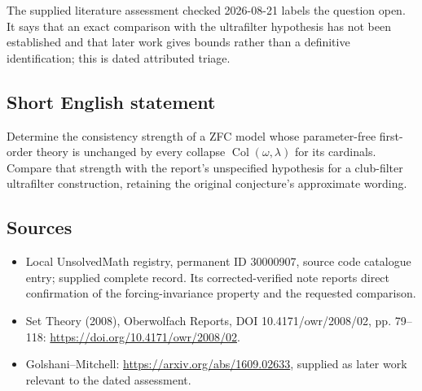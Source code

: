 \documentclass[11pt]{article}
\begin{document}
The supplied literature assessment checked 2026-08-21 labels the question open. It says that an exact comparison with the ultrafilter hypothesis has not been established and that later work gives bounds rather than a definitive identification; this is dated attributed triage.
\subsection{Short English statement}
Determine the consistency strength of a ZFC model whose parameter-free first-order theory is unchanged by every collapse $\operatorname{Col}(\omega,\lambda)$ for its cardinals. Compare that strength with the report's unspecified hypothesis for a club-filter ultrafilter construction, retaining the original conjecture's approximate wording.
\subsection{Sources}
\begin{itemize}
\item Local UnsolvedMath registry, permanent ID 30000907, source code catalogue entry; supplied complete record. Its corrected-verified note reports direct confirmation of the forcing-invariance property and the requested comparison.
\item Set Theory (2008), Oberwolfach Reports, DOI 10.4171/owr/2008/02, pp. 79--118: \url{https://doi.org/10.4171/owr/2008/02}.
\item Golshani--Mitchell: \url{https://arxiv.org/abs/1609.02633}, supplied as later work relevant to the dated assessment.
\end{itemize}
\end{document}
